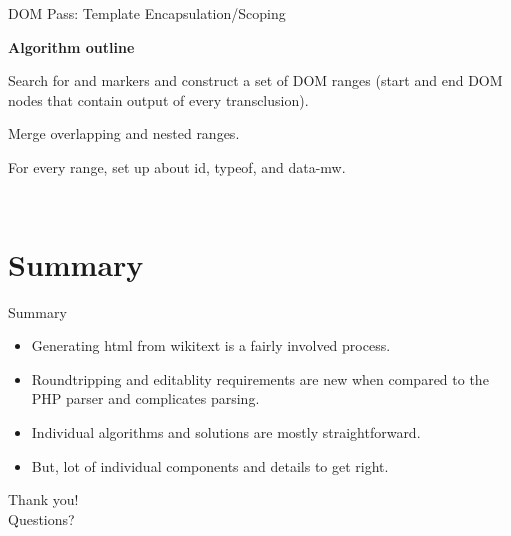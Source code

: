 \documentclass[t,xcolor=dvipsnames]{beamer}
\newcommand{\TOK}[2][\small]{\color{teal} #1{\tt #2}}
\begin{document}
\begin{frame}{DOM Pass: Template Encapsulation/Scoping}

{\bf Algorithm outline}
\begin{itemize}
  \item Search for {\TOK{\tt<tpl-start>}} and {\TOK{\tt<tpl-end>}} markers and construct a set of DOM ranges (start and end DOM nodes that contain output of every transclusion).
   {
  \item Merge overlapping and nested ranges.
  \item For every range, set up about id, typeof, and data-mw.
  }
\end{itemize}

\begin{columns}[c]
\small
\setlength{\topsep}{0pt}
\setlength{\partopsep}{0pt}
 {
  \begin{column}{0.4\textwidth}
  \hspace{-0.2ex}
  \begin{figure}
  \end{figure}
  \end{column}
}

 {
  \begin{column}{0.6\textwidth}
  \begin{figure}
  \end{figure}
  \end{column}
}
\end{columns}
\end{frame}

\section{Summary}

\begin{frame}{Summary}
\begin{itemize}
\item Generating html from wikitext is a fairly involved process.
\item Roundtripping and editablity requirements are new when compared to the PHP parser and complicates parsing.
\item Individual algorithms and solutions are mostly straightforward.
\item But, lot of individual components and details to get right.
\end{itemize}
\end{frame}

\begin{frame}

\vspace{10ex}
\begin{center}
\LARGE
Thank you! \\
Questions?
\end{center}

\end{frame}
\end{document}

